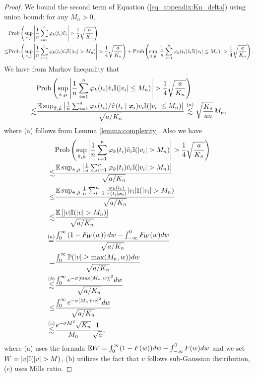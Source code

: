 \begin{proof}
We bound the second term of Equation (\ref{eq_appendix:Kn_delta}) using union bound: for any $M_n>0$,
\begin{equation}\label{eq_appendix:tildeepsilon}
\begin{split}
&\Pr\left(\sup_{\hat{\pi},\hat\mu}\left|\frac{1}{n}\sum_{i=1}^n\varphi_k(t_i)\tilde v_i\right|>\frac{1}{2}\sqrt{\frac{a}{K_n}}\right)
\\\overset{}{\leq}& \Pr\left(\sup_{\hat{\pi},\hat\mu}\left|\frac{1}{n}\sum_{i=1}^n\varphi_k(t_i)\tilde v_i\I(|v_i|> M_n)\right|>\frac{1}{4}\sqrt{\frac{a}{K_n}}\right)
+
\Pr\left(\sup_{\hat{\pi},\hat\mu}\left|\frac{1}{n}\sum_{i=1}^n\varphi_k(t_i)\tilde v_i\I(|v_i|\leq M_n)\right|>\frac{1}{4}\sqrt{\frac{a}{K_n}}\right).
\end{split}
\end{equation}
We have from Markov Inequality that
\begin{equation}\label{eq_appendix:tildev_bounded}
\begin{split}
&\Pr\left(\sup_{\hat{\pi},\hat\mu}\left|\frac{1}{n}\sum_{i=1}^n\varphi_k(t_i)\tilde v_i\I(|v_i|\leq M_n)\right|>\frac{1}{4}\sqrt{\frac{a}{K_n}}\right)
\\\lesssim&\frac{\E\sup_{\hat{\pi},\hat\mu}\left|\frac{1}{n}\sum_{i=1}^n\varphi_k(t_i)/\hat\pi(t_i\mid\x_i)v_i\I(|v_i|\leq M_n)\right|}{\sqrt{a/K_n}}
\stackrel{(a)}{\lesssim}
\sqrt{\frac{K_n}{an}}M_n,
\end{split}
\end{equation}
where (a) follows from Lemma \ref{lemma:complexity}.
Also we have
\begin{equation}\label{eq_appendix:tildev_unbounded}
\begin{split}
&\Pr\left(\sup_{\hat{\pi},\hat\mu}\left|\frac{1}{n}\sum_{i=1}^n\varphi_k(t_i)\tilde v_i\I(|v_i|> M_n)\right|>\frac{1}{4}\sqrt{\frac{a}{K_n}}\right)  
\\\lesssim&
\frac{\E\sup_{\hat{\pi},\hat\mu}\left|\frac{1}{n}\sum_{i=1}^n\varphi_k(t_i)\tilde v_i\I(|v_i|> M_n)\right|}{\sqrt{a/K_n}}
\\\leq&
\frac{\E\sup_{\hat{\pi},\hat\mu}\frac{1}{n}\sum_{i=1}^n\frac{\varphi_k(t_i)}{\hat\pi(t_i\mid\x_i)}|v_i|\I(|v_i|> M_n)}{\sqrt{a/K_n}}
\\\lesssim&
\frac{\E\left[|v|\I(|v|> M_n)\right]}{\sqrt{a/K_n}}
\\\overset{(a)}{=}&
\frac{\int_{0}^{\infty}\left(1-F_W(w)\right)dw-\int_{-\infty}^0F_W(w)dw}{\sqrt{a/K_n}}
\\=&
\frac{\int_{0}^{\infty}\P(|v|\geq\max(M_n,w))dw}{\sqrt{a/K_n}}
\\\overset{(b)}{\lesssim}&
\frac{\int_0^{\infty}e^{-\sigma[\max(M_n,w)]^2}dw}{\sqrt{a/K_n}}
\\\leq&
\frac{\int_0^{\infty}e^{-\sigma[M_n+w]^2}dw}{\sqrt{a/K_n}}
\\\overset{(c)}{\lesssim}&
\frac{e^{-\sigma M^2}\sqrt{K_n}}{M_n}\frac{1}{\sqrt{a}},
\end{split}
\end{equation}
where (a) uses the formula $\mathbb{E} W=\int_0^{\infty}(1-F(w))dw-\int_{-\infty}^0F(w)dw$ and we set $W=|v|\I(|v|> M)$, (b) utilizes the fact that $v$ follows sub-Gaussian distribution, (c) uses Mills ratio.


\end{proof}
